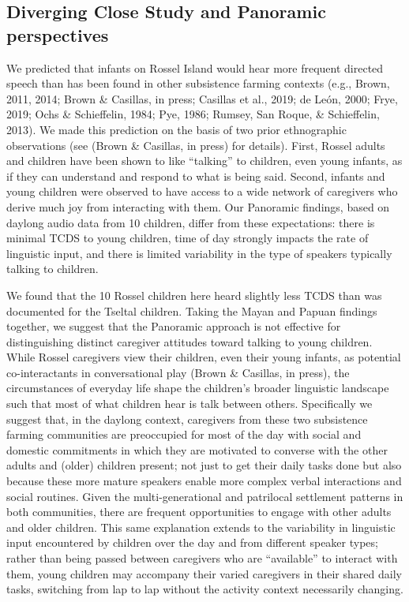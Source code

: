 \documentclass[,man,floatsintext]{apa6}
\begin{document}
\subsection{Diverging Close Study and Panoramic
perspectives}\label{diverging-close-study-and-panoramic-perspectives}

We predicted that infants on Rossel Island would hear more frequent
directed speech than has been found in other subsistence farming
contexts (e.g., Brown, 2011, 2014; Brown \& Casillas, in press; Casillas
et al., 2019; de León, 2000; Frye, 2019; Ochs \& Schieffelin, 1984; Pye,
1986; Rumsey, San Roque, \& Schieffelin, 2013). We made this prediction
on the basis of two prior ethnographic observations (see (Brown \&
Casillas, in press) for details). First, Rossel adults and children have
been shown to like \enquote{talking} to children, even young infants, as
if they can understand and respond to what is being said. Second,
infants and young children were observed to have access to a wide
network of caregivers who derive much joy from interacting with them.
Our Panoramic findings, based on daylong audio data from 10 children,
differ from these expectations: there is minimal TCDS to young children,
time of day strongly impacts the rate of linguistic input, and there is
limited variability in the type of speakers typically talking to
children.

We found that the 10 Rossel children here heard slightly less TCDS than
was documented for the Tseltal children. Taking the Mayan and Papuan
findings together, we suggest that the Panoramic approach is not
effective for distinguishing distinct caregiver attitudes toward talking
to young children. While Rossel caregivers view their children, even
their young infants, as potential co-interactants in conversational play
(Brown \& Casillas, in press), the circumstances of everyday life shape
the children's broader linguistic landscape such that most of what
children hear is talk between others. Specifically we suggest that, in
the daylong context, caregivers from these two subsistence farming
communities are preoccupied for most of the day with social and domestic
commitments in which they are motivated to converse with the other
adults and (older) children present; not just to get their daily tasks
done but also because these more mature speakers enable more complex
verbal interactions and social routines. Given the multi-generational
and patrilocal settlement patterns in both communities, there are
frequent opportunities to engage with other adults and older children.
This same explanation extends to the variability in linguistic input
encountered by children over the day and from different speaker types;
rather than being passed between caregivers who are \enquote{available}
to interact with them, young children may accompany their varied
caregivers in their shared daily tasks, switching from lap to lap
without the activity context necessarily changing.
\end{document}
